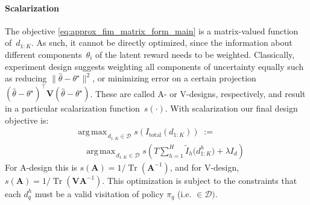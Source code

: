\documentclass{article}
\newcommand{\tstar}{\theta^{\star}}
\DeclareMathOperator*{\argmax}{arg\,max}
\newcommand{\bA}{\mathbf{A}}
\newcommand{\bV}{\mathbf{V}}
\begin{document}
 \vspace{-0.2cm} \paragraph{Scalarization}
The objective \eqref{eq:approx_fim_matrix_form_main} is a matrix-valued function of~$d_{1:K}$. As such, it cannot be directly optimized, since the information about different components~$\theta_i$ of the latent reward needs to be weighted. Classically, experiment design \cite{fedorov1997model} suggests weighting all components of uncertainty equally such as reducing $\|\hat{\theta} - \tstar\|^2$, or minimizing error on a certain projection $(\hat{\theta}{-}\tstar)^\top\mathbf{V}(\hat{\theta} {-} \tstar)$. These are called A- or V-designs, respectively, and result in a particular scalarization function~$s(\cdot)$. With scalarization our final design objective is:
\vspace{-0.1cm}\begin{equation}
\label{eq:final_objective}
\begin{aligned}
&\argmax_{\, d_{1:K} \in \mathcal{D}}
s\!\left( I_{\text{total}}(d_{1:K}) \right)
\;:=\; \\
&\quad \argmax_{\, d_{1:K} \in \mathcal{D}}
s\!\left( T \sum_{h=1}^H \tilde{I}_h\big(d_{1:K}^h\big) + \lambda I_d \right)
\end{aligned}
\end{equation}
For A-design this is $s(\bA) = 1/\operatorname{Tr}(\bA^{-1})$, and for V-design, $s(\bA) = 1/\operatorname{Tr}(\bV\bA^{-1})$.
This optimization is subject to the constraints that each $d^h_q$ must be a valid visitation of policy $\pi_q$ (i.e. $\in \mathcal{D})$. %




\end{document}
